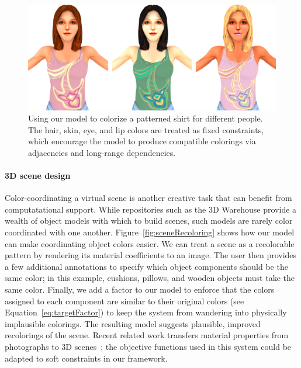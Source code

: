 \begin{figure}[h!]
\centering
\includegraphics[width=\columnwidth]{figs/fashion/composite}
\caption{Using our model to colorize a patterned shirt for different people. The hair, skin, eye, and lip colors are treated as fixed constraints, which encourage the model to produce compatible colorings via adjacencies and long-range dependencies.}
\label{fig:fashion}
\vspace{-1.0em}
\end{figure}


\paragraph{3D scene design}
Color-coordinating a virtual scene is another creative task that can benefit from computatational support. While repositories such as the 3D Warehouse provide a wealth of object models with which to build scenes, such models are rarely color coordinated with one another. Figure~\ref{fig:sceneRecoloring} shows how our model can make coordinating object colors easier. We can treat a scene as a recolorable pattern by rendering its material coefficients to an image. The user then provides a few additional annotations to specify which object components should be the same color; in this example, cushions, pillows, and wooden objects must take the same color. Finally, we add a factor to our model to enforce that the colors assigned to each component are similar to their original colors (see Equation~\ref{eq:targetFactor}) to keep the system from wandering into physically implausible colorings. The resulting model suggests plausible, improved recolorings of the scene.
Recent related work transfers material properties from photographs to 3D scenes~\cite{MaterialStyleTransfer}; the objective functions used in this system could be adapted to soft constraints in our framework.


